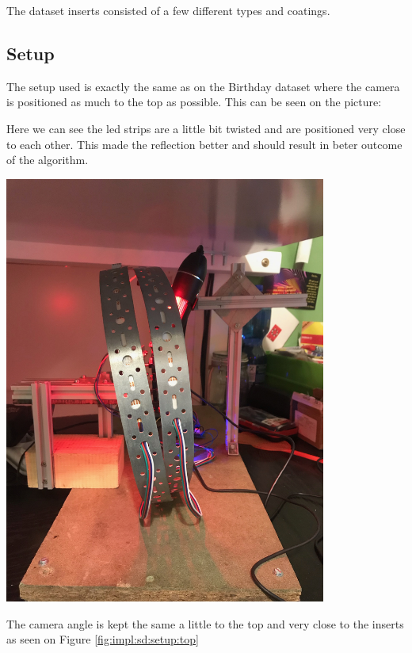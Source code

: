 The dataset inserts consisted of a few different types and coatings. 



\subsection{Setup}

The setup used is exactly the same as on the Birthday dataset where the camera is positioned as much to the top as possible. This can be seen on the picture:

Here we can see the led strips are a little bit twisted and are positioned very close to each other. This made the reflection better and should result in beter outcome of the algorithm.



\includegraphics[width=4.166667in, keepaspectratio=true, angle=270]{./fig/Vision/Dataset/automated_datasets/2_created_datasets/2_Spaghetti_dataset/IMG_9295.jpeg}



The camera angle is kept the same a little to the top and very close to the inserts as seen on Figure \ref{fig:impl:sd:setup:top}

